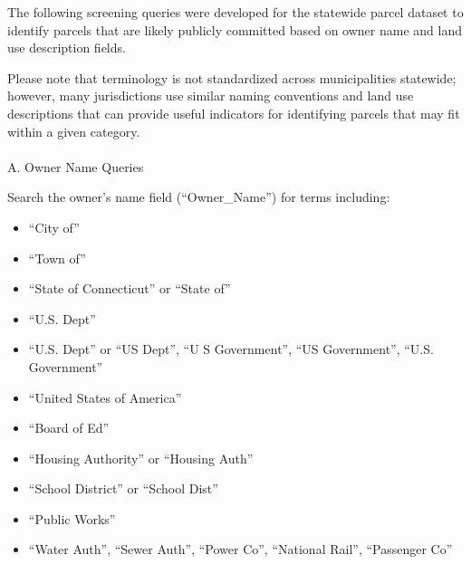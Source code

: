 \documentclass[
  letterpaper,
  DIV=11,
  numbers=noendperiod]{scrreprt}
\makeatletter
\let\oldparagraph\paragraph
\renewcommand{\paragraph}{
    \@ifstar
      \xxxParagraphStar
      \xxxParagraphNoStar
  }
\newcommand{\xxxParagraphStar}[1]{\oldparagraph*{#1}\mbox{}}
\newcommand{\xxxParagraphNoStar}[1]{\oldparagraph{#1}\mbox{}}
\providecommand{\tightlist}{%
  \setlength{\itemsep}{0pt}\setlength{\parskip}{0pt}}
\makeatother
\begin{document}
The following screening queries were developed for the statewide parcel
dataset to identify parcels that are likely publicly committed based on
owner name and land use description fields.

\begin{tcolorbox}[enhanced jigsaw, arc=.35mm, bottomrule=.15mm, breakable, colback=white, colframe=quarto-callout-note-color-frame, left=2mm, leftrule=.75mm, opacityback=0, rightrule=.15mm, toprule=.15mm]
\begin{minipage}[t]{5.5mm}
\textcolor{quarto-callout-note-color}{\faInfo}
\end{minipage}%
\begin{minipage}[t]{\textwidth - 5.5mm}

Please note that terminology is not standardized across municipalities
statewide; however, many jurisdictions use similar naming conventions
and land use descriptions that can provide useful indicators for
identifying parcels that may fit within a given category.

\end{minipage}%
\end{tcolorbox}

\paragraph{A. Owner Name Queries}\label{a.-owner-name-queries}

Search the owner's name field (``Owner\_Name'') for terms including:

\begin{itemize}
\tightlist
\item
  ``City of''
\item
  ``Town of''
\item
  ``State of Connecticut'' or ``State of''
\item
  ``U.S. Dept''
\item
  ``U.S. Dept'' or ``US Dept'', ``U S Government'', ``US Government'',
  ``U.S. Government''
\item
  ``United States of America''
\item
  ``Board of Ed''
\item
  ``Housing Authority'' or ``Housing Auth''
\item
  ``School District'' or ``School Dist''
\item
  ``Public Works''
\item
  ``Water Auth'', ``Sewer Auth'', ``Power Co'', ``National Rail'',
  ``Passenger Co''
\end{itemize}
\end{document}
